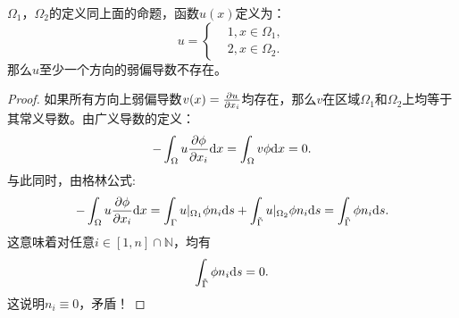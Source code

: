     \begin{proposition}
        $\Omega_{1}$，$\Omega_{2}$的定义同上面的命题，函数$u(x)$定义为：
        \begin{equation}
            u=\left\{
                \begin{aligned}
                    &1,x\in\Omega_{1},\\
                    &2,x\in\Omega_{2}.
                \end{aligned}
            \right.
        \end{equation}
        那么$u$至少一个方向的弱偏导数不存在。
    \end{proposition}
\begin{proof}
    如果所有方向上弱偏导数$v(x)=\frac{\partial u}{\partial x_{i}}$均存在，那么$v$在区域$\Omega_{1}$和$\Omega_{2}$上均等于其常义导数。由广义导数的定义：
    \begin{equation}
        -\int_{\Omega}u\frac{\partial \phi}{\partial x_{i}}\mathrm{d} x=\int_{\Omega}v\phi\mathrm{d} x=0.
    \end{equation}
    与此同时，由格林公式:
    \begin{equation}
        -\int_{\Omega}u\frac{\partial \phi}{\partial x_{i}}\mathrm{d} x=\int_{\Gamma}u|_{\Omega_{1}}\phi n_{i}\mathrm{d} s+\int_{\tilde{\Gamma}}u|_{\Omega_{2}}\phi n_{i}\mathrm{d} s=\int_{\tilde{\Gamma}}\phi n_{i}\mathrm{d} s.
    \end{equation}
    这意味着对任意$i\in [1,n]\cap\mathbb{N}$，均有
    \begin{equation}
        \int_{\tilde{\Gamma}}\phi n_{i}\mathrm{d} s=0.
    \end{equation}
    这说明$n_{i}\equiv 0$，矛盾！
\end{proof}